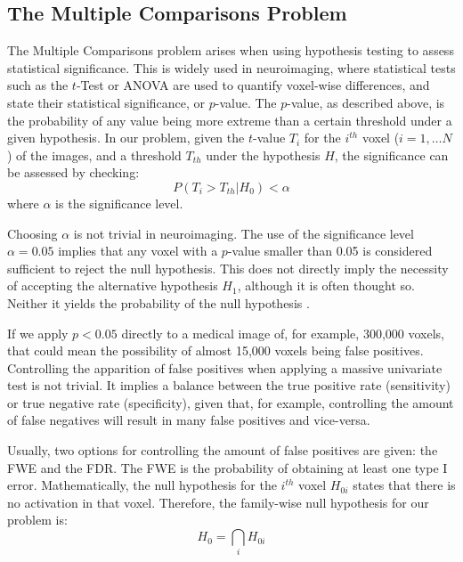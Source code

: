 \subsection{The Multiple Comparisons Problem}\label{sec:multiplecomparisons}
The Multiple Comparisons problem arises when using hypothesis testing to assess statistical significance. This is widely used in neuroimaging, where statistical tests such as the $t$-Test or \ac{ANOVA} are used to quantify voxel-wise differences, and state their statistical significance, or $p$-value. The $p$-value, as described above, is the probability of any value being more extreme than a certain threshold under a given hypothesis. In our problem, given the $t$-value $T_i$ for the $i^{th}$ voxel ($i=1,\dots N$) of the images, and a threshold $T_{th}$ under the hypothesis $H$, the significance can be assessed by checking:
\begin{equation}\label{eq:pvalue}
P \left(T_i > T_{th}| H_0\right)<\alpha
\end{equation}
where $\alpha$ is the significance level. 

Choosing $\alpha$ is not trivial in neuroimaging. The use of the significance level $\alpha=0.05$ implies that any voxel with a $p$-value smaller than 0.05 is considered sufficient to reject the null hypothesis. This does not directly imply the necessity of accepting the alternative hypothesis $H_1$, although it is often thought so. Neither it yields the probability of the null hypothesis \cite{Dixon2003}. 

If we apply $p<0.05$ directly to a medical image of, for example, 300,000 voxels, that could mean the possibility of almost 15,000 voxels being false positives. Controlling the apparition of false positives when applying a massive univariate test is not trivial. It implies a balance between the true positive rate (sensitivity) or true negative rate (specificity), given that, for example, controlling the amount of false negatives will result in many false positives and vice-versa. 

Usually, two options for controlling the amount of false positives are given: the \acf{FWE} and the \acf{FDR}. The \ac{FWE} is the probability of obtaining at least one type I error. Mathematically, the null hypothesis for the $i^{th}$ voxel $H_{0i}$ states that there is no activation in that voxel. Therefore, the family-wise null hypothesis for our problem is:
\begin{equation}
H_0 = \bigcap_i H_{0i}
\end{equation}

